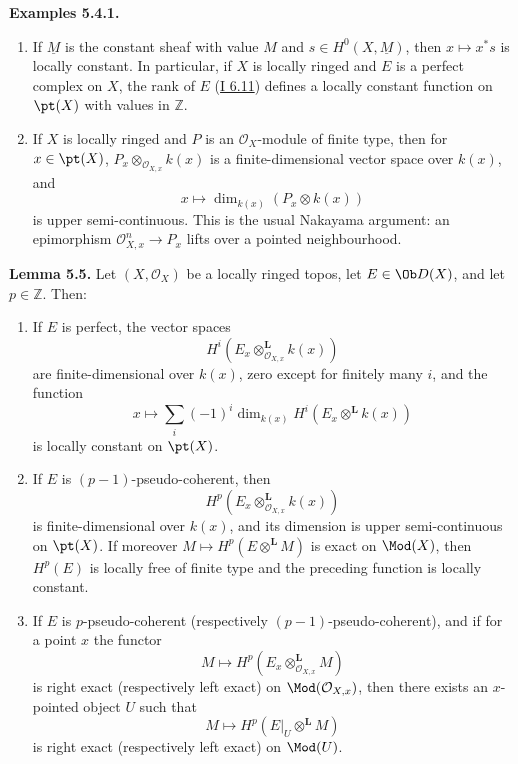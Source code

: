 \textbf{Examples 5.4.1.}
\begin{enumerate}[label=\alph*)]
\item If \(\underline M\) is the constant sheaf with value \(M\) and \(s\in H^0(X,\underline M)\), then \(x\mapsto x^*s\) is locally constant. In particular, if \(X\) is locally ringed and \(E\) is a perfect complex on \(X\), the rank of \(E\) (\hyperlink{sga6.e01.def.6-11}{I 6.11}) defines a locally constant function on \(\pt(X)\) with values in \(\mathbb Z\).
\item If \(X\) is locally ringed and \(P\) is an \(\mathcal O_X\)-module of finite type, then for \(x\in\pt(X)\), \(P_x\otimes_{\mathcal O_{X,x}}k(x)\) is a finite-dimensional vector space over \(k(x)\), and
\[
 x\longmapsto \dim_{k(x)}(P_x\otimes k(x))
\]
is upper semi-continuous. This is the usual Nakayama argument: an epimorphism \(\mathcal O_{X,x}^{n}\to P_x\) lifts over a pointed neighbourhood.
\end{enumerate}

\textbf{Lemma 5.5.} Let \((X,\mathcal O_X)\) be a locally ringed topos, let \(E\in\Ob D(X)\), and let \(p\in\mathbb Z\). Then:
\begin{enumerate}[label=\roman*)]
\item If \(E\) is perfect, the vector spaces
\[
 H^i(E_x\otimes_{\mathcal O_{X,x}}^{\mathbf L}k(x))
\]
are finite-dimensional over \(k(x)\), zero except for finitely many \(i\), and the function
\[
 x\longmapsto
 \sum_i(-1)^i\dim_{k(x)}H^i(E_x\otimes^{\mathbf L}k(x))
\]
is locally constant on \(\pt(X)\).
\item If \(E\) is \((p-1)\)-pseudo-coherent, then
\[
 H^p(E_x\otimes_{\mathcal O_{X,x}}^{\mathbf L}k(x))
\]
is finite-dimensional over \(k(x)\), and its dimension is upper semi-continuous on \(\pt(X)\). If moreover \(M\mapsto H^p(E\otimes^{\mathbf L}M)\) is exact on \(\Mod(X)\), then \(H^p(E)\) is locally free of finite type and the preceding function is locally constant.
\item If \(E\) is \(p\)-pseudo-coherent (respectively \((p-1)\)-pseudo-coherent), and if for a point \(x\) the functor
\[
 M\longmapsto H^p(E_x\otimes_{\mathcal O_{X,x}}^{\mathbf L}M)
\]
is right exact (respectively left exact) on \(\Mod(\mathcal O_{X,x})\), then there exists an \(x\)-pointed object \(U\) such that
\[
 M\longmapsto H^p(E|_U\otimes^{\mathbf L}M)
\]
is right exact (respectively left exact) on \(\Mod(U)\).
\end{enumerate}

